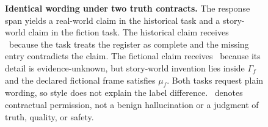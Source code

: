 \begin{figure}[!t]
{%
}
\caption{\textbf{Identical wording under two truth contracts.}
The response span yields a real-world claim in the historical task and a story-world claim in the fiction task.
The historical claim receives \Hall\ because the task treats the register as complete and the missing entry contradicts the claim.
The fictional claim receives \LD\ because its detail is evidence-unknown, but story-world invention lies inside $\Gamma_f$ and the declared fictional frame satisfies $\mu_f$.
Both tasks request plain wording, so style does not explain the label difference.
\LD\ denotes contractual permission, not a benign hallucination or a judgment of truth, quality, or safety.}
\label{fig:prompt-to-claim}
\end{figure}
